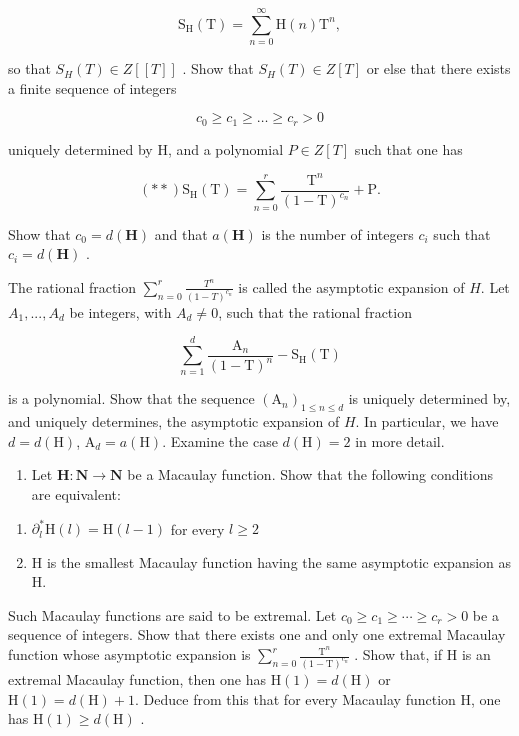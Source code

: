 \[
\mathrm{S} _ {\mathrm{H}} (\mathrm{T}) = \sum_ {n = 0} ^ {\infty} \mathrm{H} (n) \mathrm{T} ^ {n},
\]

so that \(S_{H}(T) \in Z[[T]]\) . Show that \(S_{H}(T) \in Z[T]\) or else that there exists a finite sequence of integers

\[
c _ {0} \geqslant c _ {1} \geqslant \dots \geqslant c _ {r} > 0
\]

uniquely determined by H, and a polynomial \(P \in Z[T]\) such that one has

\[
(* *) \mathrm{S} _ {\mathrm{H}} (\mathrm{T}) = \sum_ {n = 0} ^ {r} \frac {\mathrm{T} ^ {n}}{(1 - \mathrm{T}) ^ {c _ {n}}} + \mathrm{P}.
\]

Show that \(c_0 = d(\mathbf{H})\) and that \(a(\mathbf{H})\) is the number of integers \(c_i\) such that \(c_i = d(\mathbf{H})\) .

The rational fraction \(\sum_{n=0}^{r}\frac{T^n}{(1-T)^{c_n}}\) is called the asymptotic expansion of \(H\). Let \(A_1, ..., A_d\) be integers, with \(A_d \neq 0\), such that the rational fraction

\[
\sum_ {n = 1} ^ {d} \frac {\mathrm{A} _ {n}}{(1 - \mathrm{T}) ^ {n}} - \mathrm{S} _ {\mathrm{H}} (\mathrm{T})
\]

is a polynomial. Show that the sequence \((\mathrm{A}_{n})_{1\leq n\leq d}\) is uniquely determined by, and uniquely determines, the asymptotic expansion of \(H\). In particular, we have \(d=d(\mathrm{H})\), \(\mathrm{A}_{d}=a(\mathrm{H})\). Examine the case \(d(\mathrm{H})=2\) in more detail.

\begin{enumerate}
\def\labelenumi{\alph{enumi})}
\setcounter{enumi}{3}
\tightlist
\item
  Let \(\mathbf{H}:\mathbf{N}\to\mathbf{N}\) be a Macaulay function. Show that the following conditions are equivalent:
\end{enumerate}

\begin{enumerate}
\def\labelenumi{(\roman{enumi})}
\item
  \(\partial_l^*\mathrm{H}(l) = \mathrm{H}(l - 1)\) for every \(l\geqslant 2\)
\item
  H is the smallest Macaulay function having the same asymptotic expansion as H.
\end{enumerate}

Such Macaulay functions are said to be extremal. Let \(c_{0} \geqslant c_{1} \geqslant \cdots \geqslant c_{r} > 0\) be a sequence of integers. Show that there exists one and only one extremal Macaulay function whose asymptotic expansion is \(\sum_{n=0}^{r} \frac{\mathrm{T}^{n}}{(1 - \mathrm{T})^{c_{n}}}\) . Show that, if H is an extremal Macaulay function, then one has \(\mathrm{H}(1) = d(\mathrm{H})\) or \(\mathrm{H}(1) = d(\mathrm{H}) + 1\). Deduce from this that for every Macaulay function H, one has \(\mathrm{H}(1) \geqslant d(\mathrm{H})\) .

